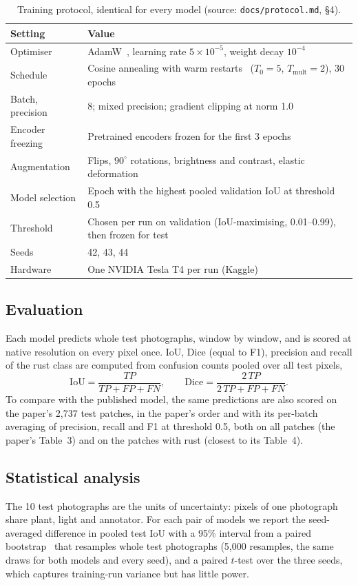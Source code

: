 \documentclass[11pt,a4paper]{article}
\begin{document}
\begin{table}[t]
\centering
\caption{Training protocol, identical for every model (source: \texttt{docs/protocol.md}, \S4).}
\label{tab:training}
\small
\begin{tabular}{ll}
\toprule
Setting & Value \\
\midrule
Optimiser & AdamW~\cite{loshchilov2019adamw}, learning rate $5\times10^{-5}$, weight decay $10^{-4}$ \\
Schedule & Cosine annealing with warm restarts~\cite{loshchilov2017sgdr} ($T_0=5$, $T_{\mathrm{mult}}=2$), 30 epochs \\
Batch, precision & 8; mixed precision; gradient clipping at norm 1.0 \\
Encoder freezing & Pretrained encoders frozen for the first 3 epochs \\
Augmentation & Flips, $90^\circ$ rotations, brightness and contrast, elastic deformation \\
Model selection & Epoch with the highest pooled validation IoU at threshold 0.5 \\
Threshold & Chosen per run on validation (IoU-maximising, 0.01--0.99), then frozen for test \\
Seeds & 42, 43, 44 \\
Hardware & One NVIDIA Tesla T4 per run (Kaggle) \\
\bottomrule
\end{tabular}
\end{table}

\subsection{Evaluation}
Each model predicts whole test photographs, window by window, and is scored at native resolution
on every pixel once. IoU, Dice (equal to F1), precision and recall of the rust class are computed
from confusion counts pooled over all test pixels,
\begin{equation}
\mathrm{IoU} = \frac{TP}{TP+FP+FN}, \qquad \mathrm{Dice} = \frac{2\,TP}{2\,TP+FP+FN}.
\end{equation}
To compare with the published model, the same predictions are also scored on the paper's 2,737
test patches, in the paper's order and with its per-batch averaging of precision, recall and F1
at threshold 0.5, both on all patches (the paper's Table~3) and on the patches with rust (closest
to its Table~4).

\subsection{Statistical analysis}
\label{sec:stats}
The 10 test photographs are the units of uncertainty: pixels of one photograph share plant, light
and annotator. For each pair of models we report the seed-averaged difference in pooled test IoU
with a 95\% interval from a paired bootstrap~\cite{efron1993bootstrap} that resamples whole test
photographs (5,000 resamples, the same draws for both models and every seed), and a paired $t$-test
over the three seeds, which captures training-run variance but has little power.
\end{document}

